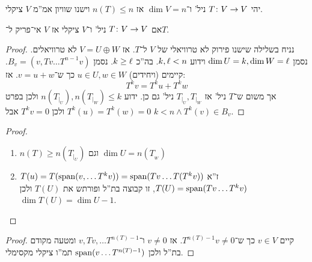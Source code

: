 \documentclass[]{../../../../tex/classes/styledArticle}
\begin{document}
    \begin{Collary}
        יהי $T \colon V \to V$ ניל' ו־$\dim V = n$ אז $n(T) \le n$ וישנו שוויון אמ''מ $V$ ציקלי. 
    \end{Collary}
    
    \begin{Collary}
        אם $T \colon V \to V$ ניל' ו־$V$ ציקלי אז $V$ אי־פריק ל־$T$. 
    \end{Collary}
    \begin{proof}
        נניח בשלילה שישנו פירוק לא טרוויאלי של $V$ ל־$T$. אז $V = U \oplus W$ לא טרוויאלים. נסמן $\dim U = k, \dim W = \ell$ וידוע $k, \ell < n$. בה''כ $k \ge \ell$. נסמן $B_v = (v, Tv \dots T^{n - 1}v)$. קיימים (ויחידים) $u \in U, w \in W$ כך ש־$v = u + w$. אז: 
        \[ T^{k}v = T^ku + T^kw \]
        אך משום ש־$T$ ניל' אז $T_{|_U}, T_{|_W}$ ניל' גם כן. ידוע $n(T_{|_U}), n(T_{|_W}) \le k$ ולכן בפרט $T^{k}(u) = T^{k}(w) = 0$ ולכן $T^{k}v = 0$ אבל $k < n \land T^k(v) \in B_v$. 
    \end{proof}
    
    \begin{proof}\,
        \begin{enumerate}
            \item $n(T) \ge n(T_{|_U})$ וגם $\dim U = n(T_{_W})$
            \item $T(u) = T(\operatorname{span}(v, \dots T^{k}v)) = \operatorname{span} (Tv \dots T(T^k v))$ ז''א $T(U) = \operatorname{span}(Tv \dots T^k v)$, זו קבוצה בת''ל ופורתש את $T(U)$ ולכן $\dim T(U) = \dim U - 1$. 
        \end{enumerate}
    \end{proof}
    
    \begin{proof}
        קיים $v \in V$ כך ש־$T^{n(T) - 1}v \neq 0$. אז $v \neq 0$ ו־$v, Tv, \dots T^{n(T) - 1}$ ומטעה מקודם בת''ל ולכן $\operatorname{span}(v \dots T^{n(T) -1})$ תמ''ו ציקלי מקסימלי. 
    \end{proof}
    
\end{document}
